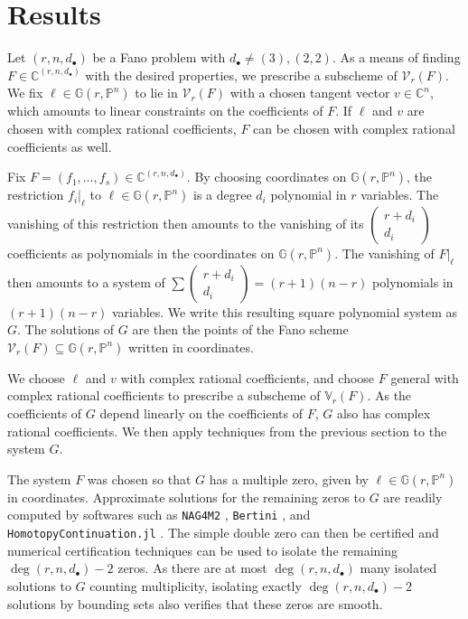 \documentclass[12pt]{amsart}
\theoremstyle{definition}
\begin{document}
\section{Results}
Let $(r,n,d_\bullet)$ be a Fano problem with $d_\bullet\ne(3),(2,2)$. As a means of finding $F\in\mathbb{C}^{(r,n,d_\bullet)}$ with the desired properties, we prescribe a subscheme of $\mathcal{V}_r(F)$. We fix $\ell\in\mathbb{G}(r,\mathbb{P}^n)$ to lie in $\mathcal{V}_r(F)$ with a chosen tangent vector $v\in\mathbb{C}^n$, which amounts to linear constraints on the coefficients of $F$. If $\ell$ and $v$ are chosen with complex rational coefficients, $F$ can be chosen with complex rational coefficients as well. 

Fix $F=(f_1,\dotsc,f_s)\in\mathbb{C}^{(r,n,d_\bullet)}$. By choosing coordinates on $\mathbb{G}(r,\mathbb{P}^n)$, the restriction $f_i|_\ell$ to $\ell\in\mathbb{G}(r,\mathbb{P}^n)$ is a degree $d_i$ polynomial in $r$ variables. The vanishing of this restriction then amounts to the vanishing of its $\left(\begin{smallmatrix}r+d_i\\d_i\end{smallmatrix}\right)$ coefficients as polynomials in the coordinates on $\mathbb{G}(r,\mathbb{P}^n)$. The vanishing of $F|_\ell$ then amounts to a system of $\sum\left(\begin{smallmatrix}r+d_i\\d_i\end{smallmatrix}\right) = (r+1)(n-r)$ polynomials in $(r+1)(n-r)$ variables. We write this resulting square polynomial system as $G$. The solutions of $G$ are then the points of the Fano scheme $\mathcal{V}_r(F)\subseteq\mathbb{G}(r,\mathbb{P}^n)$ written in coordinates.

We choose $\ell$ and $v$ with complex rational coefficients, and choose $F$ general with complex rational coefficients to prescribe a subscheme of $\mathbb{V}_r(F)$. As the coefficients of $G$ depend linearly on the coefficients of $F$, $G$ also has complex rational coefficients. We then apply techniques from the previous section to the system $G$. 

The system $F$ was chosen so that $G$ has a multiple zero, given by $\ell\in\mathbb{G}(r,\mathbb{P}^n)$ in coordinates. Approximate solutions for the remaining zeros to $G$ are readily computed by softwares such as \texttt{NAG4M2} \cite{NAG4M2}, \texttt{Bertini} \cite{Bertini}, and \texttt{HomotopyContinuation.jl} \cite{HCJL}. The simple double zero can then be certified and numerical certification techniques can be used to isolate the remaining $\deg(r,n,d_\bullet)-2$ zeros. As there are at most $\deg(r,n,d_\bullet)$ many isolated solutions to $G$ counting multiplicity, isolating exactly $\deg(r,n,d_\bullet)-2$ solutions by bounding sets also verifies that these zeros are smooth. 
\end{document}
